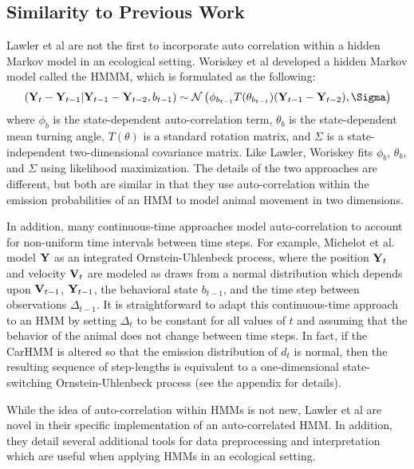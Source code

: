 \subsection{Similarity to Previous Work}

Lawler et al are not the first to incorporate auto correlation within a hidden Markov model in an ecological setting. Woriskey et al \cite{Whoriskey:2016} developed a hidden Markov model called the HMMM, which is formulated as the following:
%
$$\left(\bfY_t - \bfY_{t-1} |\bfY_{t-1} - \bfY_{t-2}, b_{t-1}\right) \sim \mathcal{N}\left( \phi_{b_{t-1}} T(\theta_{b_{t-1}})(\bfY_{t-1} - \bfY_{t-2}),\Sigma\right)$$
%
where $\phi_b$ is the state-dependent auto-correlation term, $\theta_b$ is the state-dependent mean turning angle, $T(\theta)$ is a standard rotation matrix, and $\Sigma$ is a state-independent two-dimensional covariance matrix. Like Lawler, Woriskey fits $\phi_b$, $\theta_b$, and $\Sigma$ using likelihood maximization. The details of the two approaches are different, but both are similar in that they use auto-correlation within the emission probabilities of an HMM to model animal movement in two dimensions.

In addition, many continuous-time approaches model auto-correlation to account for non-uniform time intervals between time steps. For example, Michelot et al. \cite{Michelot:2019} model $\mathbf{Y}$ as an integrated Ornstein-Uhlenbeck process, where the position $\mathbf{Y}_t$ and velocity $\mathbf{V}_t$ are modeled as draws from a normal distribution which depends upon $\mathbf{V}_{t-1}$, $\mathbf{Y}_{t-1}$, the behavioral state $b_{t-1}$, and the time step between observations $\Delta_{t-1}$. It is straightforward to adapt this continuous-time approach to an HMM by setting $\Delta_{t}$ to be constant for all values of $t$ and assuming that the behavior of the animal does not change between time steps. In fact, if the CarHMM is altered so that the emission distribution of $d_t$ is normal, then the resulting sequence of step-lengths is equivalent to a one-dimensional state-switching Ornstein-Uhlenbeck process (see the appendix for details).

While the idea of auto-correlation within HMMs is not new, Lawler et al are novel in their specific implementation of an auto-correlated HMM. In addition, they detail several additional tools for data preprocessing and interpretation which are useful when applying HMMs in an ecological setting.

\fi